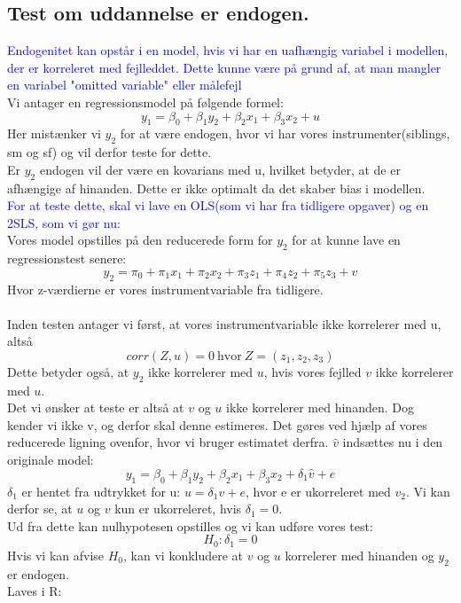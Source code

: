 \documentclass[
  10pt,
]{article}
\begin{document}
\hypertarget{test-om-uddannelse-er-endogen.}{%
\subsection{Test om uddannelse er
endogen.}\label{test-om-uddannelse-er-endogen.}}

\leavevmode

\textcolor{blue}{Endogenitet kan opstår i en model, hvis vi har en uafhængig variabel i modellen, der er korreleret med fejlleddet. Dette kunne være på grund af, at man mangler en variabel "omitted variable" eller målefejl}\\
Vi antager en regressionsmodel på følgende formel:
\[ y_1 = \beta_0 + \beta_1y_2+\beta_2x_1+\beta_3x_2+u\] Her mistænker vi
\(y_2\) for at være endogen, hvor vi har vores instrumenter(siblings, sm
og sf) og vil derfor teste for dette.\\
Er \(y_2\) endogen vil der være en kovarians med u, hvilket betyder, at
de er afhængige af hinanden. Dette er ikke optimalt da det skaber bias i
modellen.\\
\textcolor{blue}{For at teste dette, skal vi lave en OLS(som vi har fra tidligere opgaver) og en 2SLS, som vi gør nu:}\\
Vores model opstilles på den reducerede form for \(y_2\) for at kunne
lave en regressionstest senere:
\[ y_2=\pi_0+\pi_1x_1+\pi_2x_2+\pi_3z_1+\pi_4z_2+\pi_5z_3+v\] Hvor
z-værdierne er vores instrumentvariable fra tidligere.\\
~\\
Inden testen antager vi først, at vores instrumentvariable ikke
korrelerer med u, altså \[corr(Z,u)=0\ \text{hvor}\ Z=(z_1,z_2,z_3) \]
Dette betyder også, at \(y_2\) ikke korrelerer med \(u\), hvis vores
fejlled \(v\) ikke korrelerer med \(u\).\\
Det vi ønsker at teste er altså at \(v\) og \(u\) ikke korrelerer med
hinanden. Dog kender vi ikke v, og derfor skal denne estimeres. Det
gøres ved hjælp af vores reducerede ligning ovenfor, hvor vi bruger
estimatet derfra. \(\hat{v}\) indsættes nu i den originale model:
\[ y_1 = \beta_0 + \beta_1y_2+\beta_2x_1+\beta_3x_2+\delta_1\hat{v}+ e\]
\(\delta_1\) er hentet fra udtrykket for u: \(u=\delta_1v+e\), hvor e er
ukorreleret med \(v_2\). Vi kan derfor se, at \(u\) og \(v\) kun er
ukorreleret, hvis \(\delta_1=0\).\\
Ud fra dette kan nulhypotesen opstilles og vi kan udføre vores test:
\[H_0:\delta_1=0\] Hvis vi kan afvise \(H_0\), kan vi konkludere at
\(v\) og \(u\) korrelerer med hinanden og \(y_2\) er endogen.\\
Laves i R:
\end{document}
